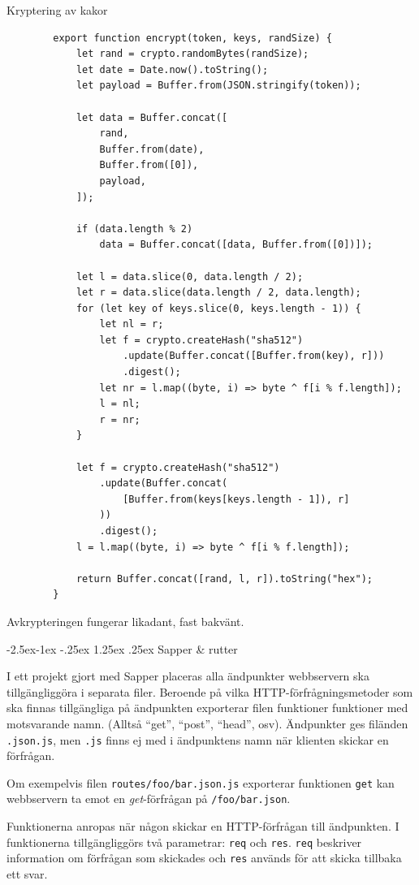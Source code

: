 \documentclass{article}
\makeatletter
\renewcommand\paragraph{\@startsection{paragraph}{4}{\z@}%
			{-2.5ex\@plus -1ex \@minus -.25ex}%
			{1.25ex \@plus .25ex}%
			{\normalfont\normalsize\bfseries}}
\makeatother
\begin{document}
\begin{listing}[H]
	\caption{Kryptering av kakor}
	\begin{verbatim}
		export function encrypt(token, keys, randSize) {
			let rand = crypto.randomBytes(randSize);
			let date = Date.now().toString();
			let payload = Buffer.from(JSON.stringify(token));

			let data = Buffer.concat([
				rand,
				Buffer.from(date),
				Buffer.from([0]),
				payload,
			]);

			if (data.length % 2)
				data = Buffer.concat([data, Buffer.from([0])]);

			let l = data.slice(0, data.length / 2);
			let r = data.slice(data.length / 2, data.length);
			for (let key of keys.slice(0, keys.length - 1)) {
				let nl = r;
				let f = crypto.createHash("sha512")
					.update(Buffer.concat([Buffer.from(key), r]))
					.digest();
				let nr = l.map((byte, i) => byte ^ f[i % f.length]);
				l = nl;
				r = nr;
			}

			let f = crypto.createHash("sha512")
				.update(Buffer.concat(
					[Buffer.from(keys[keys.length - 1]), r]
				))
				.digest();
			l = l.map((byte, i) => byte ^ f[i % f.length]);

			return Buffer.concat([rand, l, r]).toString("hex");
		}
	\end{verbatim}
\end{listing}

Avkrypteringen fungerar likadant, fast bakvänt.

\paragraph{Sapper \& rutter}

I ett projekt gjort med Sapper placeras alla ändpunkter webbservern ska
tillgängliggöra i separata filer. Beroende på vilka HTTP-förfrågningsmetoder som
ska finnas tillgängliga på ändpunkten exporterar filen funktioner funktioner med
motsvarande namn. (Alltså ``get'', ``post'', ``head'', osv). Ändpunkter ges
filänden \texttt{.json.js}, men \texttt{.js} finns ej med i ändpunktens namn när
klienten skickar en förfrågan.

Om exempelvis filen \texttt{routes/foo/bar.json.js} exporterar funktionen
\texttt{get} kan webbservern ta emot en \textit{get}-förfrågan på
\texttt{/foo/bar.json}.

Funktionerna anropas när någon skickar en HTTP-förfrågan till ändpunkten. I
funktionerna tillgängliggörs två parametrar: \texttt{req} och \texttt{res}.
\texttt{req} beskriver information om förfrågan som skickades och \texttt{res}
används för att skicka tillbaka ett svar.
\end{document}
